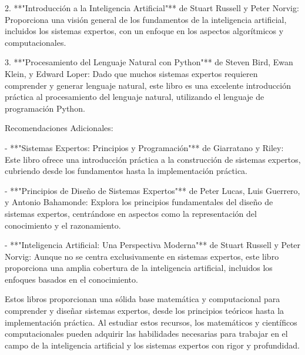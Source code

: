 \documentclass{article}
\begin{document}
2. **"Introducción a la Inteligencia Artificial"** de Stuart Russell y Peter Norvig: Proporciona una visión general de los fundamentos de la inteligencia artificial, incluidos los sistemas expertos, con un enfoque en los aspectos algorítmicos y computacionales.

3. **"Procesamiento del Lenguaje Natural con Python"** de Steven Bird, Ewan Klein, y Edward Loper: Dado que muchos sistemas expertos requieren comprender y generar lenguaje natural, este libro es una excelente introducción práctica al procesamiento del lenguaje natural, utilizando el lenguaje de programación Python.

 Recomendaciones Adicionales:

- **"Sistemas Expertos: Principios y Programación"** de Giarratano y Riley: Este libro ofrece una introducción práctica a la construcción de sistemas expertos, cubriendo desde los fundamentos hasta la implementación práctica.

- **"Principios de Diseño de Sistemas Expertos"** de Peter Lucas, Luis Guerrero, y Antonio Bahamonde: Explora los principios fundamentales del diseño de sistemas expertos, centrándose en aspectos como la representación del conocimiento y el razonamiento.

- **"Inteligencia Artificial: Una Perspectiva Moderna"** de Stuart Russell y Peter Norvig: Aunque no se centra exclusivamente en sistemas expertos, este libro proporciona una amplia cobertura de la inteligencia artificial, incluidos los enfoques basados en el conocimiento.

Estos libros proporcionan una sólida base matemática y computacional para comprender y diseñar sistemas expertos, desde los principios teóricos hasta la implementación práctica. Al estudiar estos recursos, los matemáticos y científicos computacionales pueden adquirir las habilidades necesarias para trabajar en el campo de la inteligencia artificial y los sistemas expertos con rigor y profundidad.
\end{document}

